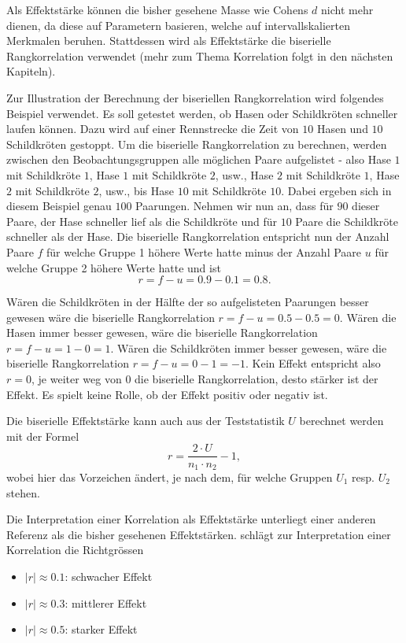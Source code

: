 \documentclass[
]{book}
\providecommand{\tightlist}{%
  \setlength{\itemsep}{0pt}\setlength{\parskip}{0pt}}
\theoremstyle{definition}
\theoremstyle{definition}
\theoremstyle{definition}
\theoremstyle{definition}
\theoremstyle{remark}
\begin{document}
Als Effektstärke können die bisher gesehene Masse wie Cohens \(d\) nicht mehr dienen, da diese auf Parametern basieren, welche auf intervallskalierten Merkmalen beruhen. Stattdessen wird als Effektstärke die biserielle Rangkorrelation verwendet (mehr zum Thema Korrelation folgt in den nächsten Kapiteln).

Zur Illustration der Berechnung der biseriellen Rangkorrelation wird folgendes Beispiel verwendet. Es soll getestet werden, ob Hasen oder Schildkröten schneller laufen können. Dazu wird auf einer Rennstrecke die Zeit von \(10\) Hasen und \(10\) Schildkröten gestoppt. Um die biserielle Rangkorrelation zu berechnen, werden zwischen den Beobachtungsgruppen alle möglichen Paare aufgelistet - also Hase \(1\) mit Schildkröte \(1\), Hase \(1\) mit Schildkröte \(2\), usw., Hase \(2\) mit Schildkröte \(1\), Hase \(2\) mit Schildkröte \(2\), usw., bis Hase \(10\) mit Schildkröte \(10\). Dabei ergeben sich in diesem Beispiel genau \(100\) Paarungen. Nehmen wir nun an, dass für \(90\) dieser Paare, der Hase schneller lief als die Schildkröte und für \(10\) Paare die Schildkröte schneller als der Hase. Die biserielle Rangkorrelation entspricht nun der Anzahl Paare \(f\) für welche Gruppe 1 höhere Werte hatte minus der Anzahl Paare \(u\) für welche Gruppe 2 höhere Werte hatte und ist
\[r = f - u = 0.9 - 0.1 = 0.8.\]

Wären die Schildkröten in der Hälfte der so aufgelisteten Paarungen besser gewesen wäre die biserielle Rangkorrelation \(r = f-u=0.5 - 0.5 = 0\). Wären die Hasen immer besser gewesen, wäre die biserielle Rangkorrelation \(r = f-u = 1-0 = 1\). Wären die Schildkröten immer besser gewesen, wäre die biserielle Rangkorrelation \(r = f-u = 0-1 = -1\). Kein Effekt entspricht also \(r = 0\), je weiter weg von \(0\) die biserielle Rangkorrelation, desto stärker ist der Effekt. Es spielt keine Rolle, ob der Effekt positiv oder negativ ist.

Die biserielle Effektstärke kann auch aus der Teststatistik \(U\) berechnet werden mit der Formel
\[r = \frac{2\cdot U}{n_1\cdot n_2}-1,\]
wobei hier das Vorzeichen ändert, je nach dem, für welche Gruppen \(U_1\) resp. \(U_2\) stehen.

Die Interpretation einer Korrelation als Effektstärke unterliegt einer anderen Referenz als die bisher gesehenen Effektstärken. \citet{cohen1988} schlägt zur Interpretation einer Korrelation die Richtgrössen

\begin{itemize}
\tightlist
\item
  \(|r| \approx 0.1\): schwacher Effekt
\item
  \(|r| \approx 0.3\): mittlerer Effekt
\item
  \(|r| \approx 0.5\): starker Effekt
\end{itemize}
\end{document}
